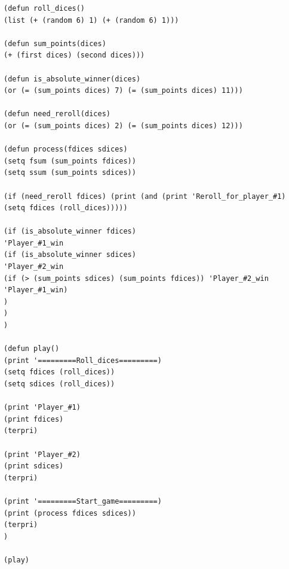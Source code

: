 \documentclass[12pt]{report}
\begin{document}
\begin{lstlisting}
(defun roll_dices()
(list (+ (random 6) 1) (+ (random 6) 1)))

(defun sum_points(dices)
(+ (first dices) (second dices)))

(defun is_absolute_winner(dices)
(or (= (sum_points dices) 7) (= (sum_points dices) 11)))

(defun need_reroll(dices)
(or (= (sum_points dices) 2) (= (sum_points dices) 12)))

(defun process(fdices sdices)
(setq fsum (sum_points fdices))
(setq ssum (sum_points sdices))

(if (need_reroll fdices) (print (and (print 'Reroll_for_player_#1) (setq fdices (roll_dices)))))

(if (is_absolute_winner fdices) 
'Player_#1_win
(if (is_absolute_winner sdices) 
'Player_#2_win
(if (> (sum_points sdices) (sum_points fdices)) 'Player_#2_win 'Player_#1_win)
)
)
)

(defun play()
(print '=========Roll_dices=========)
(setq fdices (roll_dices))
(setq sdices (roll_dices))

(print 'Player_#1) 
(print fdices)
(terpri)

(print 'Player_#2) 
(print sdices)
(terpri)

(print '=========Start_game=========)
(print (process fdices sdices))
(terpri)
)

(play)
\end{lstlisting}
\end{document}
